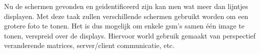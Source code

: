 Nu de schermen gevonden en geidentificeerd zijn kan men wat meer dan lijntjes displayen. Met deze taak zullen verschillende schermen gebruikt worden om een grotere foto te tonen. Het is dus mogelijk om enkele gsm's samen één image te tonen, verspreid over de displays. Hiervoor world gebruik gemaakt van perspectief veranderende matrices, server/client communicatie, etc.